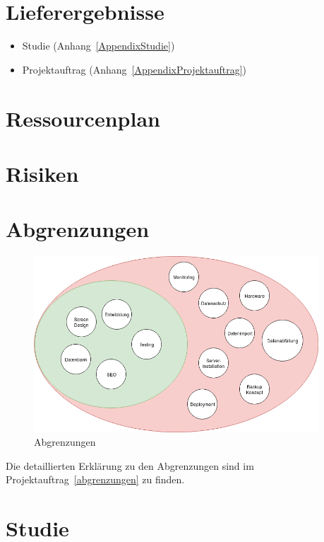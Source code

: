 \section{Lieferergebnisse}

\begin{itemize}
  \tightlist
  \item
    Studie (Anhang~\ref{AppendixStudie})
  \item
    Projektauftrag (Anhang~\ref{AppendixProjektauftrag})
\end{itemize}

\section{Ressourcenplan}

\section{Risiken}

\clearpage

\section{Abgrenzungen}

\begin{figure}[!htb]
  \centering
  \includegraphics[width=0.95\textwidth]{figures/abgrenzungen.png}
  \caption{Abgrenzungen}
\end{figure}

Die detaillierten Erklärung zu den Abgrenzungen sind im Projektauftrag~\ref{abgrenzungen} zu finden.

\clearpage

\section{Studie}

